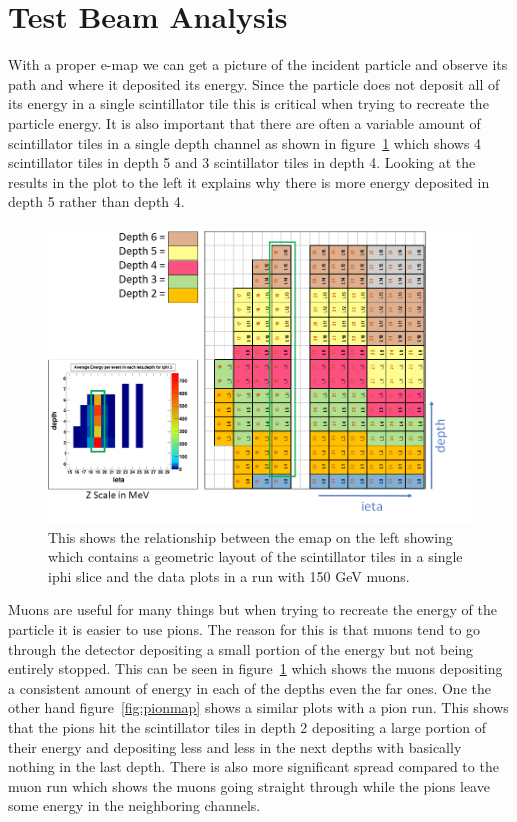 \section{Test Beam Analysis}

With a proper e-map we can get a picture of the incident particle and observe its path and where it deposited its energy. Since the particle does not deposit all of its energy in a single scintillator tile this is critical when trying to recreate the particle energy. It is also important that there are often a variable amount of scintillator tiles in a single depth channel as shown in figure~\ref{fig:emap} which shows 4 scintillator tiles in depth 5 and 3 scintillator tiles in depth 4. Looking at the results in the plot to the left it explains why there is more energy deposited in depth 5 rather than depth 4. 

\begin{figure}
\centering
\includegraphics[width=\linewidth]{Figures/eplot.png}
\caption{This shows the relationship between the emap on the left showing which contains a geometric layout of the scintillator tiles in a single iphi slice and the data plots in a run with 150 GeV muons.}
\label{fig:emap}
\end{figure}

Muons are useful for many things but when trying to recreate the energy of the particle it is easier to use pions. The reason for this is that muons tend to go through the detector depositing a small portion of the energy but not being entirely stopped. This can be seen in figure~\ref{fig:emap} which shows the muons depositing a consistent amount of energy in each of the depths even the far ones. One the other hand figure~\ref{fig:pionmap} shows a similar plots with a pion run. This shows that the pions hit the scintillator tiles in depth 2 depositing a large portion of their energy and depositing less and less in the next depths with basically nothing in the last depth. There is also more significant spread compared to the muon run which shows the muons going straight through while the pions leave some energy in the neighboring channels.


